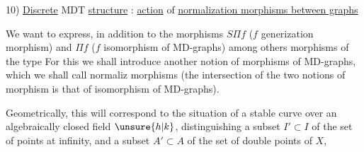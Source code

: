 10) \uline{Discrete} MDT \uline{structure} : \uline{action} of \uline{normalization morphisms between graphs}

We want to express, in addition to the morphisms
$S\Pi f$ ($f$ generization morphism) and $\Pi f$ ($f$ isomorphism of MD-graphs)
among others morphisms of the type
For this we shall introduce another notion of morphisms of MD-graphs,
which we shall call normaliz morphisms
(the intersection of the two notions of morphism is that of isomorphism of MD-graphs).

Geometrically, this will correspond to the situation of a stable curve
over an algebraically closed field $\unsure{h|k}$, distinguishing a subset $I'\subset I$
of the set of points at infinity, and a subset $A'\subset A$ of the set of double points of $X$,
